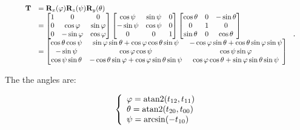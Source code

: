     \begin{equation}
        \scalebox{0.85}{
            $ \begin{array}{ll}
                \mathbf{T}
                &= \mathbf{R}_{x}(\varphi)\mathbf{R}_{z}(\psi)\mathbf{R}_{y}(\theta) \\
                &=
                \begin{bmatrix}
                    1 & 0 & 0 \\
                    0 & \cos \varphi & \sin \varphi \\
                    0 & -\sin \varphi & \cos \varphi
                \end{bmatrix}
                \begin{bmatrix}
                    \cos \psi & \sin \psi & 0 \\
                    -\sin \psi & \cos \psi & 0 \\
                    0 & 0 & 1
                \end{bmatrix}
                \begin{bmatrix}
                    \cos \theta & 0 & -\sin \theta \\
                    0 & 1 & 0 \\
                    \sin \theta & 0 & \cos \theta
                \end{bmatrix} \\
                &=
                \begin{bmatrix}
                    \cos \theta \cos \psi
                    &  \sin \varphi \sin \theta + \cos \varphi \cos \theta \sin \psi
                    & -\cos \varphi \sin \theta + \cos \theta \sin \varphi \sin \psi \\
                    -\sin \psi
                    & \cos \varphi \cos \psi
                    & \cos \psi \sin \varphi \\
                    \cos \psi \sin \theta
                    & -\cos \theta \sin \varphi + \cos \varphi \sin \theta \sin \psi
                    & \cos \varphi \cos \theta + \sin \varphi \sin \theta \sin \psi
                \end{bmatrix}
            \end{array} $
        }
    .\end{equation}

    The the angles are:

    \begin{equation}
        \left\{ \begin{array}{l}
            \varphi = \operatorname{atan2}(t_{12}, t_{11}) \\
            \theta = \operatorname{atan2}(t_{20}, t_{00}) \\
            \psi = \arcsin(-t_{10})
        \end{array} \right.
    \end{equation}

